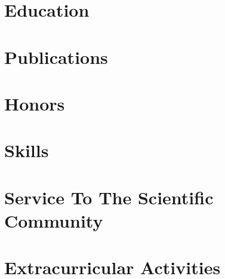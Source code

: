 \documentclass{prometheus_cv}
\begin{document}
\thispagestyle{empty}					%
\pagestyle{fancy}			 		%

\vspace*{-1cm}
\centering 


\vspace*{0.4cm}
\section{Education}


\section{Publications}


\section{Honors}


\section{Skills}



\section{Service To The Scientific Community}



\section{Extracurricular Activities}

\end{document}
